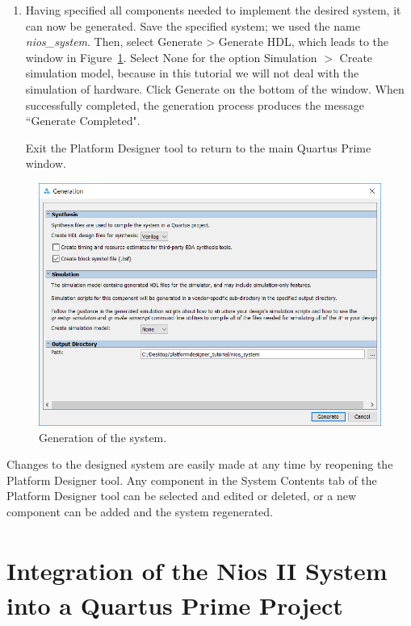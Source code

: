 \documentclass[11pt, twoside, pdftex]{article}
\begin{document}
\begin{enumerate}
\item Having specified all components needed to implement the desired system,
it can now be generated.
Save the specified system; we used the name {\it nios\_system}. 
Then, select {\sf Generate > Generate HDL},
which leads to the window in Figure~\ref{fig:20}. 
Select {\sf None} for the option {\sf Simulation $>$ Create simulation model}, 
because in this tutorial we will not deal with the simulation of hardware. 
Click {\sf Generate} on the bottom of the window. 
When successfully completed, the generation process produces 
the message ``Generate Completed".

Exit the Platform Designer tool to return to the main Quartus Prime window.
\end{enumerate}

\begin{figure}[H]
   \begin{center}
      \includegraphics[scale=0.6]{figures/figure20.png}
   \end{center}
   \caption{Generation of the system.} 
	\label{fig:20}
\end{figure}

Changes to the designed system are easily made at any time by reopening the
Platform Designer tool. Any component in the System Contents
tab of the Platform Designer tool can be selected and edited or deleted, or a new component can be
added and the system regenerated.

\section{Integration of the Nios\textsuperscript{\textregistered} II System into a Quartus\textsuperscript{\textregistered} Prime Project}
\end{document}
